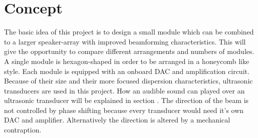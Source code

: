 \chapter{Concept}\label{sec:concept}


The basic idea of this project is to design a small module which can be combined to a larger speaker-array with improved beamforming characteristics. This will give the opportunity to compare different arrangements and numbers of modules. A single module is hexagon-shaped in order to be arranged in a honeycomb like style. Each module is equipped with an onboard DAC and amplification circuit.\p
Because of their size and their more focused dispersion characteristics, ultrasonic transducers are used in this project. How an audible sound can played over an ultrasonic transducer will be explained in section .\p
The direction of the beam is not controlled by phase shifting because every transducer would need it's own DAC and amplifier. Alternatively the direction is altered by a mechanical contraption.